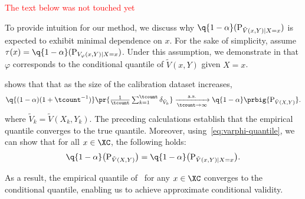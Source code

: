  \textcolor{red}{The text below was not touched yet}


  To provide intuition for our method, we discuss why \(\q{1-\alpha}(\textup{P}_{\tilde{V}(x, Y) \mid X=x})\) is expected to exhibit minimal dependence on \(x\). For the sake of simplicity, assume \(\tau(x) = \q{1-\alpha}(\textup{P}_{V_\varphi(x, Y) \mid X=x})\). Under this assumption, we demonstrate in  that \(\varphi\) corresponds to the conditional quantile of \(\tilde{V}(x, Y)\) given \(X=x\). 

  \cite[Lemma~21.2]{van2000asymptotic} shows that   that as the size of the calibration dataset increases, 
  \begin{equation*}
    \textstyle
    \q{(1-\alpha)(1+\tcount^{-1})}\pr{\frac{1}{\tcount} \sum_{k=1}^{\tcount} \delta_{\tilde{V}_{k}}}
    \xrightarrow[\tcount \to \infty]{\text{a.s.}} \q{1-\alpha}\prbig{\textup{P}_{\tilde{V}(X,Y)}}.
  \end{equation*}
  where $\tilde{V}_{k}=\tilde{V}(X_k,Y_k)$. The preceding calculations establish that the empirical quantile converges to the true quantile. Moreover, using~\eqref{eq:varphi-quantile}, we can show that for all \(x \in \XC\), the following holds:
\begin{equation*}
    \q{1-\alpha}\big(\textup{P}_{\tilde{V}(X, Y)}\big) 
    = \q{1-\alpha}\big(\textup{P}_{\tilde{V}(x, Y) \mid X = x}\big).
\end{equation*}

As a result, the empirical quantile of \RCP\ for any \(x \in \XC\) converges to the conditional quantile, enabling us to achieve approximate conditional validity. 
